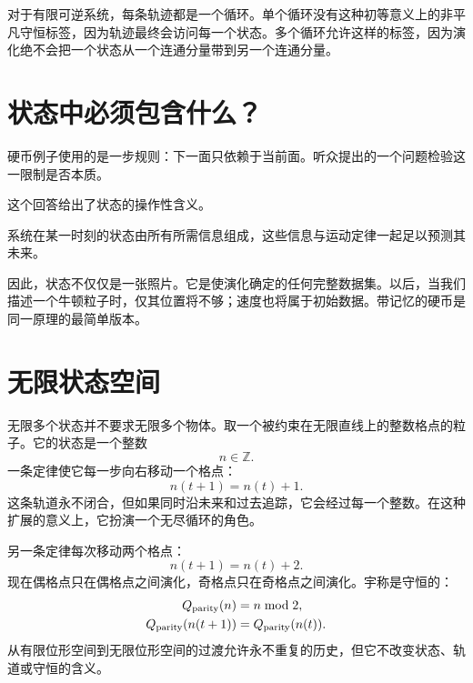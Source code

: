 对于有限可逆系统，每条轨迹都是一个循环。单个循环没有这种初等意义上的非平凡守恒标签，因为轨迹最终会访问每一个状态。多个循环允许这样的标签，因为演化绝不会把一个状态从一个连通分量带到另一个连通分量。

\section{状态中必须包含什么？}

硬币例子使用的是一步规则：下一面只依赖于当前面。听众提出的一个问题检验这一限制是否本质。

\begin{classroomqa}

\end{classroomqa}

这个回答给出了状态的操作性含义。

\begin{definition}
系统在某一时刻的状态由所有所需信息组成，这些信息与运动定律一起足以预测其未来。
\end{definition}

因此，状态不仅仅是一张照片。它是使演化确定的任何完整数据集。以后，当我们描述一个牛顿粒子时，仅其位置将不够；速度也将属于初始数据。带记忆的硬币是同一原理的最简单版本。

\section{无限状态空间}

无限多个状态并不要求无限多个物体。取一个被约束在无限直线上的整数格点的粒子。它的状态是一个整数
\[
  n\in\mathbb Z.
\]
一条定律使它每一步向右移动一个格点：
\begin{equation}
  n(t+1)=n(t)+1.
  \label{eq:lattice-one}
\end{equation}
这条轨道永不闭合，但如果同时沿未来和过去追踪，它会经过每一个整数。在这种扩展的意义上，它扮演一个无尽循环的角色。

另一条定律每次移动两个格点：
\begin{equation}
  n(t+1)=n(t)+2.
  \label{eq:lattice-two}
\end{equation}
现在偶格点只在偶格点之间演化，奇格点只在奇格点之间演化。宇称是守恒的：
\begin{equation}
  \begin{aligned}
    Q_{\rm parity}(n)&=n\bmod 2,\\
    Q_{\rm parity}(n(t+1))&=Q_{\rm parity}(n(t)).
  \end{aligned}
\end{equation}
从有限位形空间到无限位形空间的过渡允许永不重复的历史，但它不改变状态、轨道或守恒的含义。


